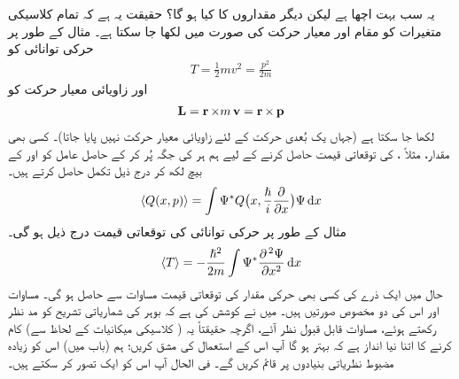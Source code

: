 یہ سب بہت اچھا ہے  لیکن دیگر مقداروں کا کیا ہو گا؟ حقیقت یہ ہے کہ تمام کلاسیکی متغیرات کو مقام اور معیار حرکت کی صورت میں لکھا جا سکتا ہے۔ مثال کے طور پر حرکی توانائی کو
\begin{align*}
T=\frac{1}{2}mv^{2}=\frac{p^{2}}{2m}
\end{align*}
اور زاویائی معیار حرکت کو 
\begin{align*}
\operatorname{\mathbf{L}}=\operatorname{\mathbf{r}}\times m\operatorname{\mathbf{v}}=\operatorname{\mathbf{r}}\times \operatorname{\mathbf{p}}
\end{align*}
لکھا جا سکتا ہے (جہاں یک بُعدی حرکت کے لئے  زاویائی معیار حرکت نہیں پایا جاتا)۔ کسی بھی مقدار،  مثلاً  ، کی توقعاتی قیمت  حاصل کرنے کے لیے ہم ہر   کی جگہ  پُر کر کے حاصل عامل کو  اور  کے بیچ  لکھ  کر درج ذیل تکمل حاصل کرتے ہیں۔
\begin{align}\label{مساوات_تفاعل_موج_توقعاتی_قیمت_حصول}
\langle Q(x,p) \rangle=\int \Psi^*Q\big (x,\frac{\hslash}{i}\frac{\partial}{\partial{x}}\big )\Psi \dif{x}
\end{align}
مثال کے طور پر حرکی توانائی کی توقعاتی قیمت درج ذیل ہو گی۔
\begin{align}
\langle T \rangle=-\frac{\hslash ^{2}}{2m}\int \Psi^*\frac{\partial^{\,2}\Psi}{\partial{x^{2}}}\dif{x}
\end{align}
حال  میں ایک ذرے  کی کسی بھی حرکی مقدار کی توقعاتی قیمت  مساوات   سے حاصل ہو گی۔ 
مساوات  اور   اس کی دو مخصوص صورتیں ہیں۔ میں نے کوشش کی ہے کہ بوہر کی شماریاتی تشریح کو مد نظر رکھتے ہوئے،    مساوات   قابل قبول نظر آئے، اگرچہ  حقیقتاً یہ  (  کلاسیکی میکانیات کے لحاظ سے) کام  کرنے کا  اتنا   نیا  انداز    ہے کہ بہتر ہو گا   آپ اس کے استعمال  کی مشق  کریں؛      ہم (باب   میں)  اس کو زیادہ مضبوط نظریاتی بنیادوں پر قائم  کریں گے۔    فی الحال آپ اس کو ایک   تصور کر سکتے ہیں۔


